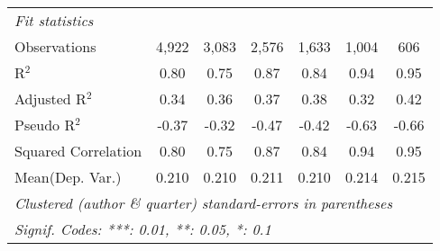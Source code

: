 \begin{tabular}{lcccccc}
   \midrule
   \emph{Fit statistics}\\
   Observations                                               & 4,922          & 3,083          & 2,576        & 1,633    & 1,004         & 606\\  
   R$^2$                                                      & 0.80           & 0.75           & 0.87         & 0.84     & 0.94          & 0.95\\  
   Adjusted R$^2$                                             & 0.34           & 0.36           & 0.37         & 0.38     & 0.32          & 0.42\\  
   Pseudo R$^2$                                               & -0.37          & -0.32          & -0.47        & -0.42    & -0.63         & -0.66\\  
   Squared Correlation                                        & 0.80           & 0.75           & 0.87         & 0.84     & 0.94          & 0.95\\  
Mean(Dep. Var.) & 0.210 & 0.210 & 0.211 & 0.210 & 0.214 & 0.215 \\
   \midrule \midrule
   \multicolumn{7}{l}{\emph{Clustered (author \& quarter) standard-errors in parentheses}}\\
   \multicolumn{7}{l}{\emph{Signif. Codes: ***: 0.01, **: 0.05, *: 0.1}}\\
\end{tabular}
\par\endgroup
